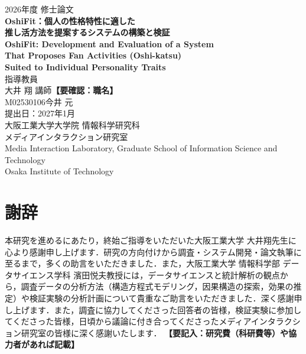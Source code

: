 \documentclass[uplatex,dvipdfmx,a4paper,11pt,openany]{jsreport}
\newcommand{\todo}[1]{\textbf{【#1】}}
\begin{document}
\begin{titlepage}
\begin{center}
{\Large 2026年度 修士論文}\\[34mm]
{\LARGE\bfseries OshiFit：個人の性格特性に適した\\[2mm]推し活方法を提案するシステムの構築と検証}\\[12mm]
{\large\bfseries OshiFit: Development and Evaluation of a System\\That Proposes Fan Activities (Oshi-katsu)\\Suited to Individual Personality Traits}\\[20mm]
{\large 指導教員}\\[2mm]
{\large 大井 翔 講師}\todo{要確認：職名}\\[14mm]
{\large M02530106\quad 今井 元}\\[6mm]
{\large 提出日：2027年1月}\\[30mm]
{大阪工業大学大学院 情報科学研究科\\メディアインタラクション研究室}\\[3mm]
{\small Media Interaction Laboratory, Graduate School of Information Science and Technology\\Osaka Institute of Technology}
\end{center}
\end{titlepage}




\tableofcontents
\listoffigures
\listoftables
\clearpage
{}









\chapter*{謝辞}
本研究を進めるにあたり，終始ご指導をいただいた大阪工業大学 大井翔先生に心より感謝申し上げます．研究の方向付けから調査・システム開発・論文執筆に至るまで，多くの助言をいただきました．また，大阪工業大学 情報科学部 データサイエンス学科 濱田悦夫教授には，データサイエンスと統計解析の観点から，調査データの分析方法（構造方程式モデリング，因果構造の探索，効果の推定）や検証実験の分析計画について貴重なご助言をいただきました．深く感謝申し上げます．また，調査に協力してくださった回答者の皆様，検証実験に参加してくださった皆様，日頃から議論に付き合ってくださったメディアインタラクション研究室の皆様に深く感謝いたします．
\todo{要記入：研究費（科研費等）や協力者があれば記載}
\end{document}
